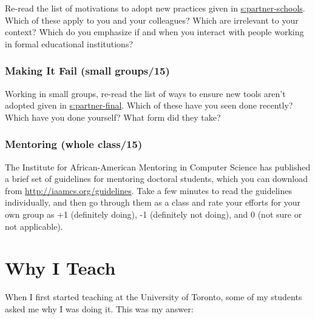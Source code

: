 Re-read the list of motivations to adopt new practices given in
\protect\hyperlink{SECTION}{s:partner-schools}. Which of these apply to you and your
colleagues? Which are irrelevant to your context? Which do you emphasize
if and when you interact with people working in formal educational
institutions?

\subsection{Making It Fail (small groups/15)}\label{making-it-fail-small-groups15}

Working in small groups, re-read the list of ways to ensure new tools
aren't adopted given in \protect\hyperlink{SECTION}{s:partner-final}. Which of these
have you seen done recently? Which have you done yourself? What form did
they take?

\subsection{Mentoring (whole class/15)}\label{mentoring-whole-class15}

The Institute for African-American Mentoring in Computer Science has
published a brief set of guidelines for mentoring doctoral students,
which you can download from \url{http://iaamcs.org/guidelines}. Take a few
minutes to read the guidelines individually, and then go through them as
a class and rate your efforts for your own group as +1 (definitely
doing), -1 (definitely not doing), and 0 (not sure or not applicable).

\chapter{Why I Teach}\label{s:finale}

When I first started teaching at the University of Toronto, some of my
students asked me why I was doing it. This was my answer:

